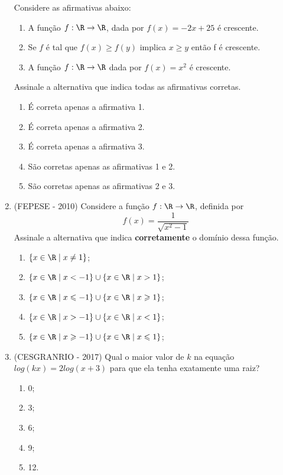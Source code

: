 \begin{enumerate}
Considere as afirmativas abaixo:
\begin{enumerate}[1.]
\item A função $f:\R \rightarrow \R$, dada por $f(x) = -2x + 25$ é crescente.

\item Se $f$ é tal que $f(x) \geqslant f(y)$ implica $x \geqslant y$ então f é crescente.

\item A função $f: \R \rightarrow \R$ dada por $f(x) = x^2$  é crescente.
\end{enumerate}

Assinale a alternativa que indica todas as afirmativas corretas.

\begin{enumerate}
 \item É correta apenas a afirmativa 1.
 \item É correta apenas a afirmativa 2.
 \item É correta apenas a afirmativa 3.
 \item São corretas apenas as afirmativas 1 e 2.
 \item São corretas apenas as afirmativas 2 e 3.
\end{enumerate}

\item (FEPESE - 2010) Considere a função $f: \R \rightarrow \R$, definida por
\[f(x)= \frac{1}{\sqrt{x^2 - 1}}\]
Assinale a alternativa que indica \textbf{corretamente} o domínio dessa função.
\begin{enumerate}
\item $\{x \in \R \mid x \neq 1\}$;
\item $\{x \in \R \mid x < -1\} \cup \{x \in \R \mid x > 1\}$;
\item $\{x \in \R \mid x \leqslant -1\} \cup \{x \in \R \mid x \geqslant 1\}$;
\item $\{x \in \R \mid x > -1\} \cup \{x \in \R \mid x < 1\}$;
\item $\{x \in \R \mid x \geqslant -1\} \cup \{x \in \R \mid x \leqslant 1\}$;
\end{enumerate}

\item (CESGRANRIO - 2017) Qual o maior valor de $k$ na equação $log(kx) = 2log(x+3)$ para que ela tenha exatamente uma raiz?
\begin{enumerate}
\item 0;
\item 3;
\item 6;
\item 9;
\item 12.
\end{enumerate}


\end{enumerate}

